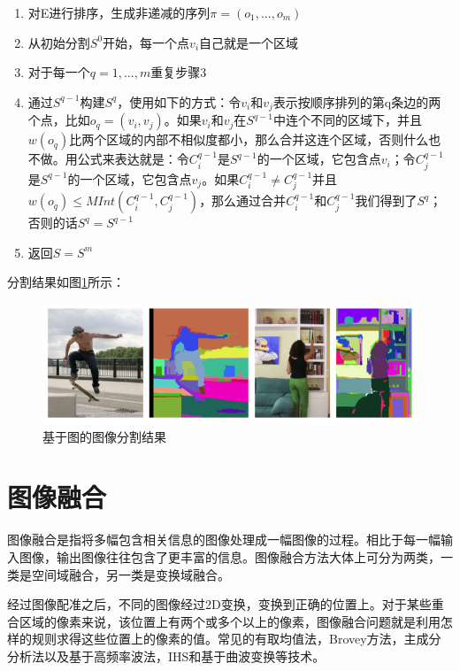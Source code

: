 \begin{enumerate}
\item 对E进行排序，生成非递减的序列\(\pi = (o_1,...,o_m)\)
\item 从初始分割\(S^0\)开始，每一个点\(v_i\)自己就是一个区域
\item 对于每一个\(q = 1,...,m\)重复步骤3
\item 通过\(S^{q-1}\)构建\(S^q\)，使用如下的方式：令\(v_i\)和\(v_j\)表示按顺序排列的第q条边的两个点，比如\(o_q = (v_i,v_j)\)。如果\(v_i\)和\(v_j\)在\(S^{q-1}\)中连个不同的区域下，并且\(w(o_q)\)比两个区域的内部不相似度都小，那么合并这连个区域，否则什么也不做。用公式来表达就是：令\(C_{i}^{q-1}\)是\(S^{q-1}\)的一个区域，它包含点\(v_i\)；令\(C_{j}^{q-1}\)是\(S^{q-1}\)的一个区域，它包含点\(v_j\)。如果\(C_{i}^{q-1} \neq C_{j}^{q-1}\)并且\(w(o_q) \leq MInt(C_i^{q-1},C_j^{q-1})\)，那么通过合并\(C_{i}^{q-1}\)和\(C_{j}^{q-1}\)我们得到了\(S^q\)；否则的话\(S^q = S^{q-1}\)
\item 返回\(S = S^m\)
\end{enumerate}

分割结果如图\ref{fig:segment}所示：
\begin{figure}
\centering\includegraphics[width=15cm]{imgs/ch2/segment}
\caption{基于图的图像分割结果}
\label{fig:segment}
\end{figure}

\section{图像融合}

图像融合是指将多幅包含相关信息的图像处理成一幅图像的过程。相比于每一幅输入图像，输出图像往往包含了更丰富的信息。图像融合方法大体上可分为两类，一类是空间域融合，另一类是变换域融合。

经过图像配准之后，不同的图像经过2D变换，变换到正确的位置上。对于某些重合区域的像素来说，该位置上有两个或多个以上的像素，图像融合问题就是利用怎样的规则求得这些位置上的像素的值。常见的有取均值法，Brovey方法，主成分分析法以及基于高频率波法，IHS和基于曲波变换等技术。

